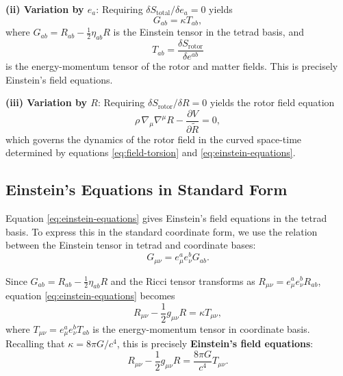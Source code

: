 \documentclass[11pt,a4paper]{article}
\numberwithin{equation}{section}
\theoremstyle{plain}
\theoremstyle{definition}
\theoremstyle{remark}
\begin{document}
\textbf{(ii) Variation by $e_a$}: Requiring $\delta S_{\mathrm{total}}/\delta e_a = 0$ yields
\begin{equation}
G_{ab} = \kappa T_{ab},
\label{eq:einstein-equations}
\end{equation}
where $G_{ab} = R_{ab} - \frac{1}{2}\eta_{ab}R$ is the Einstein tensor in the tetrad basis, and
\begin{equation}
T_{ab} = \frac{\delta S_{\mathrm{rotor}}}{\delta e^{ab}}
\end{equation}
is the energy-momentum tensor of the rotor and matter fields. This is precisely Einstein's field equations.

\textbf{(iii) Variation by $R$}: Requiring $\delta S_{\mathrm{rotor}}/\delta R = 0$ yields the rotor field equation
\begin{equation}
\rho\, \nabla_\mu \nabla^\mu R - \frac{\partial V}{\partial \widetilde{R}} = 0,
\label{eq:rotor-dynamics}
\end{equation}
which governs the dynamics of the rotor field in the curved space-time determined by equations \eqref{eq:field-torsion} and \eqref{eq:einstein-equations}.

\subsection{Einstein's Equations in Standard Form}

Equation \eqref{eq:einstein-equations} gives Einstein's field equations in the tetrad basis. To express this in the standard coordinate form, we use the relation between the Einstein tensor in tetrad and coordinate bases:
\begin{equation}
G_{\mu\nu} = e_\mu^a e_\nu^b G_{ab}.
\end{equation}

Since $G_{ab} = R_{ab} - \frac{1}{2}\eta_{ab}R$ and the Ricci tensor transforms as $R_{\mu\nu} = e_\mu^a e_\nu^b R_{ab}$, equation \eqref{eq:einstein-equations} becomes
\begin{equation}
R_{\mu\nu} - \frac{1}{2}g_{\mu\nu}R = \kappa T_{\mu\nu},
\label{eq:einstein-standard}
\end{equation}
where $T_{\mu\nu} = e_\mu^a e_\nu^b T_{ab}$ is the energy-momentum tensor in coordinate basis. Recalling that $\kappa = 8\pi G/c^4$, this is precisely \textbf{Einstein's field equations}:
\begin{equation}
R_{\mu\nu} - \frac{1}{2}g_{\mu\nu}R = \frac{8\pi G}{c^4} T_{\mu\nu}.
\label{eq:einstein-final}
\end{equation}
\end{document}

